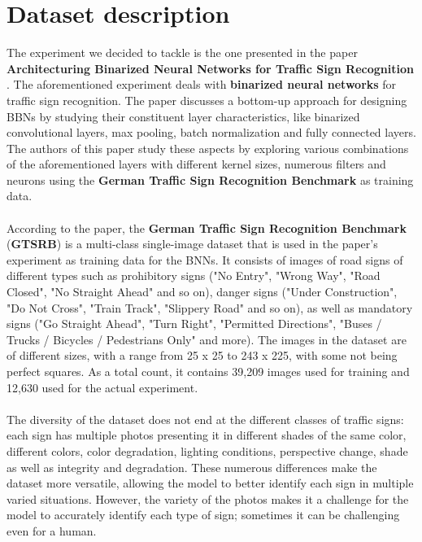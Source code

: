\documentclass[12pt,a4paper]{report}
\newcommand\tab[1][5mm]{\hspace*{#1}}
\begin{document}
\chapter{Dataset description}
\tab The experiment we decided to tackle is the one presented in the paper \textbf{Architecturing Binarized Neural Networks for Traffic Sign Recognition} \cite{traffic_signs_paper}. The aforementioned experiment deals with \textbf{binarized neural networks} for traffic sign recognition. The paper discusses a bottom-up approach for designing BBNs by studying their constituent layer characteristics, like binarized convolutional layers, max pooling, batch normalization and fully connected layers. The authors of this paper study these aspects by exploring various combinations of the aforementioned layers with different kernel sizes, numerous filters and neurons using the \textbf{German Traffic Sign Recognition Benchmark} as training data.\\\\
\tab According to the paper, the \textbf{German Traffic Sign Recognition Benchmark} (\textbf{GTSRB}) is a multi-class single-image dataset that is used in the paper's experiment as training data for the BNNs. It consists of images of road signs of different types such as prohibitory signs ("No Entry", "Wrong Way", "Road Closed", "No Straight Ahead" and so on), danger signs ("Under Construction", "Do Not Cross", "Train Track", "Slippery Road" and so on), as well as mandatory signs ("Go Straight Ahead", "Turn Right", "Permitted Directions", "Buses / Trucks / Bicycles / Pedestrians Only" and more). The images in the dataset are of different sizes, with a range from 25 x 25 to 243 x 225, with some not being perfect squares. As a total count, it contains 39,209 images used for training and 12,630 used for the actual experiment.\\\\
The diversity of the dataset does not end at the different classes of traffic signs: each sign has multiple photos presenting it in different shades of the same color, different colors, color degradation, lighting conditions, perspective change, shade as well as integrity and degradation. These numerous differences make the dataset more versatile, allowing the model to better identify each sign in multiple varied situations. However, the variety of the photos makes it a challenge for the model to accurately identify each type of sign; sometimes it can be challenging even for a human.\\ \\
\end{document}
